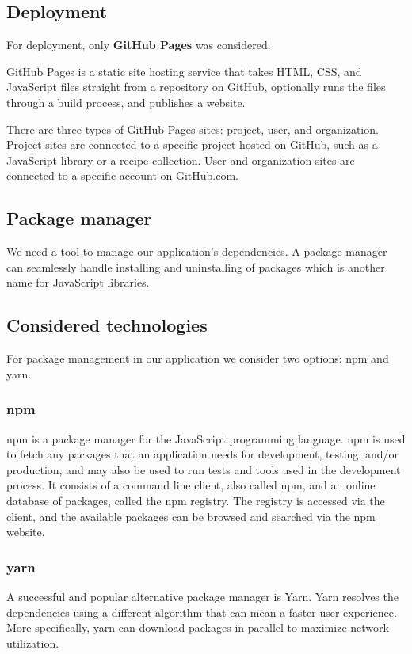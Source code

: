 \subsection{Deployment}
  For deployment, only \textbf{GitHub Pages} was considered.

  GitHub Pages is a static site hosting service that takes HTML, CSS, and JavaScript files straight from a repository on GitHub, optionally runs the files through a build process, and publishes a website.

  There are three types of GitHub Pages sites: project, user, and organization. Project sites are connected to a specific project hosted on GitHub, such as a JavaScript library or a recipe collection. User and organization sites are connected to a specific account on GitHub.com.


\subsection{Package manager}
  We need a tool to manage our application's dependencies.
  A package manager can seamlessly handle installing and uninstalling of packages which is another name for JavaScript libraries.

  \subsection*{Considered technologies}
  For package management in our application we consider two options: npm and yarn.

  \subsubsection*{npm}
  npm is a package manager for the JavaScript programming language.
  npm is used to fetch any packages that an application needs for development, testing, and/or production, and may also be used to run tests and tools used in the development process.
  It consists of a command line client, also called npm, and an online database of packages, called the npm registry. 
  The registry is accessed via the client, and the available packages can be browsed and searched via the npm website.

  \subsubsection*{yarn}
  A successful and popular alternative package manager is Yarn. 
  Yarn resolves the dependencies using a different algorithm that can mean a faster user experience.
  More specifically, yarn can download packages in parallel to maximize network utilization.

